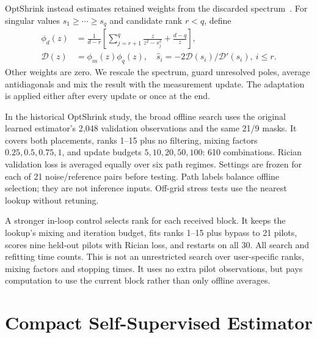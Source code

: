 \documentclass[10pt,journal,letterpaper]{IEEEtran}
\begin{document}
OptShrink instead estimates retained weights from the discarded spectrum~\cite{nadakuditi2014}. For singular values $s_1\ge\cdots\ge s_q$ and candidate rank $r<q$, define
\begin{align}
 \phi_d(z)&=\frac{1}{d-r}\left[\sum_{j=r+1}^{q}\frac{z}{z^2-s_j^2}+\frac{d-q}{z}\right],\nonumber\\
 \mathcal D(z)&=\phi_m(z)\phi_q(z),\quad
 \widehat s_i=-2\mathcal D(s_i)/\mathcal D'(s_i),\ i\le r.
\end{align}
Other weights are zero. We rescale the spectrum, guard unresolved poles, average antidiagonals and mix the result with the measurement update. The adaptation is applied either after every update or once at the end.

In the historical OptShrink study, the broad offline search uses the original learned estimator's 2,048 validation observations and the same 21/9 masks. It covers both placements, ranks 1--15 plus no filtering, mixing factors $0.25,0.5,0.75,1$, and update budgets $5,10,20,50,100$: 610 combinations. Rician validation loss is averaged equally over six path regimes. Settings are frozen for each of 21 noise/reference pairs before testing. Path labels balance offline selection; they are not inference inputs. Off-grid stress tests use the nearest lookup without retuning.

A stronger in-loop control selects rank for each received block. It keeps the lookup's mixing and iteration budget, fits ranks 1--15 plus bypass to 21 pilots, scores nine held-out pilots with Rician loss, and restarts on all 30. All search and refitting time counts. This is not an unrestricted search over user-specific ranks, mixing factors and stopping times. It uses no extra pilot observations, but pays computation to use the current block rather than only offline averages.

\section{Compact Self-Supervised Estimator}
\end{document}
